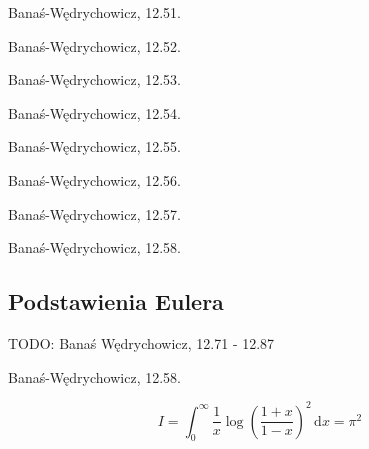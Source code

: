 \begin{integral}
    Banaś-Wędrychowicz, 12.51.
\end{integral}

\begin{integral}
    Banaś-Wędrychowicz, 12.52.
\end{integral}

\begin{integral}
    Banaś-Wędrychowicz, 12.53.
\end{integral}

\begin{integral}
    Banaś-Wędrychowicz, 12.54.
\end{integral}

\begin{integral}
    Banaś-Wędrychowicz, 12.55.
\end{integral}

\begin{integral}
    Banaś-Wędrychowicz, 12.56.
\end{integral}

\begin{integral}
    Banaś-Wędrychowicz, 12.57.
\end{integral}

\begin{integral}
    Banaś-Wędrychowicz, 12.58.
\end{integral}

\subsection{Podstawienia Eulera}

TODO: Banaś Wędrychowicz, 12.71 - 12.87

\begin{integral}
    Banaś-Wędrychowicz, 12.58.
\end{integral}

\begin{integral}
    \begin{equation}
        I = \int_0^\infty \frac{1}{x} \log \left(\frac{1+x}{1-x}\right)^2 \,\mathrm{d}x = \pi^2
    \end{equation}
\end{integral}

